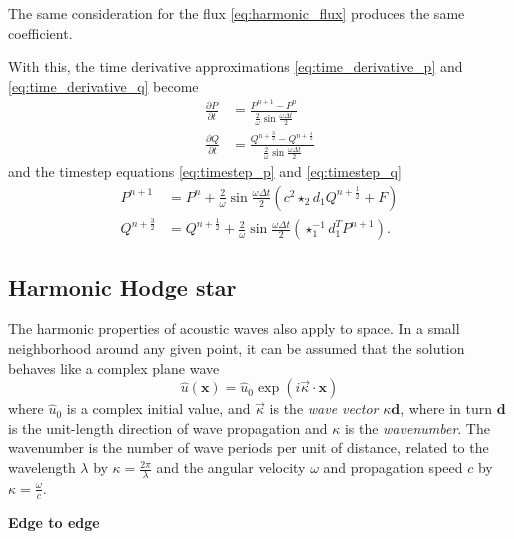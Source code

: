 \documentclass[utf8,english]{gradu3}
\begin{document}
The same consideration for the flux \eqref{eq:harmonic_flux}
produces the same coefficient.

With this, the time derivative approximations \eqref{eq:time_derivative_p}
and \eqref{eq:time_derivative_q} become
\begin{align}
\label{eq:time_derivative_p_har}
\frac{\partial P}{\partial t}
&= \frac{P^{n+1} - P^n}{\frac{2}{\omega}\sin\frac{\omega \Delta t}{2}} \\
\label{eq:time_derivative_q_har}
\frac{\partial Q}{\partial t}
&= \frac{Q^{n+\frac{3}{2}} - Q^{n+\frac{1}{2}}}{\frac{2}{\omega}\sin\frac{\omega \Delta t}{2}}
\end{align}
and the timestep equations \eqref{eq:timestep_p} and \eqref{eq:timestep_q}
\begin{align}
\label{eq:timestep_p_har}
P^{n+1} &= P^n
+ \frac{2}{\omega}\sin\frac{\omega \Delta t}{2} (c^2 \star_2 d_1 Q^{n+\frac{1}{2}} + F) \\
\label{eq:timestep_q_har}
Q^{n+\frac{3}{2}} &= Q^{n+\frac{1}{2}}
+ \frac{2}{\omega}\sin\frac{\omega \Delta t}{2} (\star_1^{-1} d_1^T P^{n+1}).
\end{align}


\subsection{Harmonic Hodge star}\label{sec:harmonic_hodge}

The harmonic properties of acoustic waves also apply to space.
In a small neighborhood around any given point,
it can be assumed that the solution behaves like a complex plane wave
\begin{equation}\label{eq:plane_wave}
  \hat{u}(\mathbf{x}) = \hat{u}_0 \exp(i\vec{\kappa} \cdot \mathbf{x})
\end{equation}
where $\hat{u}_0$ is a complex initial value,
and $\vec{\kappa}$ is the \textit{wave vector} $\kappa \mathbf{d}$,
where in turn $\mathbf{d}$ is the unit-length direction of wave propagation
and $\kappa$ is the \textit{wavenumber}.
The wavenumber is the number of wave periods per unit of distance,
related to the wavelength $\lambda$ by $\kappa = \frac{2\pi}{\lambda}$
and the angular velocity $\omega$ and propagation speed $c$ by
$\kappa = \frac{\omega}{c}$.

\textbf{Edge to edge}
\end{document}
